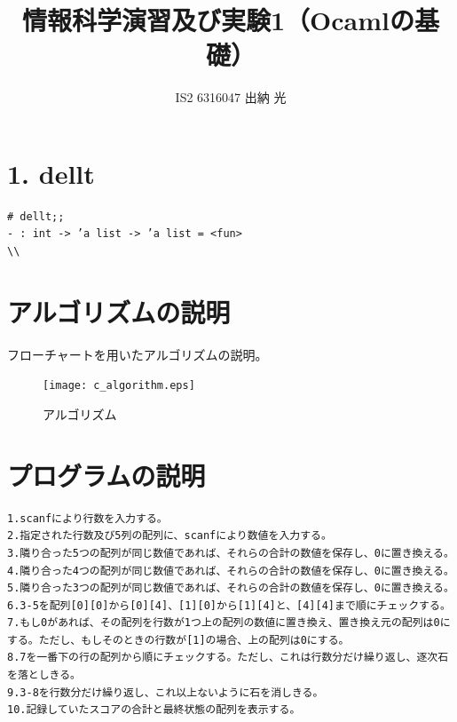 \documentclass{jarticle}
\title{情報科学演習及び実験1（Ocamlの基礎）}
\author{IS2 6316047 出納 光}
\begin{document}
\maketitle

\section{1. dellt}
\begin{verbatim}
# dellt;;
- : int -> ’a list -> ’a list = <fun> 
\\

\end{verbatim}

\newpage
\section{アルゴリズムの説明}
フローチャートを用いたアルゴリズムの説明。
\begin{figure}[!h]
\begin{center}
\texttt{[image: c\_algorithm.eps]}
\end{center}
\caption{アルゴリズム}
\end{figure}

\newpage
\section{プログラムの説明}
\begin{verbatim}
1.scanfにより行数を入力する。
2.指定された行数及び5列の配列に、scanfにより数値を入力する。
3.隣り合った5つの配列が同じ数値であれば、それらの合計の数値を保存し、0に置き換える。
4.隣り合った4つの配列が同じ数値であれば、それらの合計の数値を保存し、0に置き換える。
5.隣り合った3つの配列が同じ数値であれば、それらの合計の数値を保存し、0に置き換える。
6.3-5を配列[0][0]から[0][4]、[1][0]から[1][4]と、[4][4]まで順にチェックする。
7.もし0があれば、その配列を行数が1つ上の配列の数値に置き換え、置き換え元の配列は0にする。ただし、もしそのときの行数が[1]の場合、上の配列は0にする。
8.7を一番下の行の配列から順にチェックする。ただし、これは行数分だけ繰り返し、逐次石を落としきる。
9.3-8を行数分だけ繰り返し、これ以上ないように石を消しきる。
10.記録していたスコアの合計と最終状態の配列を表示する。
\end{verbatim}

\newpage
\end{document}
